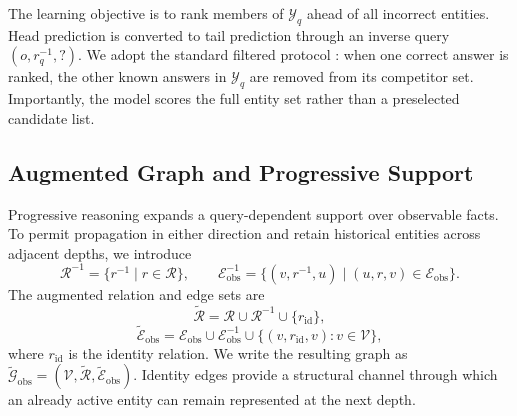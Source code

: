 \documentclass[a4paper,fleqn]{cas-sc}
\begin{document}
The learning objective is to rank members of $\mathcal{Y}_{q}$ ahead of all
incorrect entities. Head prediction is converted to tail prediction through an
inverse query $(o,r_q^{-1},?)$. We adopt the standard filtered protocol
\citep{bordes2013transe}: when one correct answer is ranked, the other known
answers in $\mathcal{Y}_{q}$ are removed from its competitor set. Importantly,
the model scores the full entity set rather than a preselected candidate list.

\subsection{Augmented Graph and Progressive Support}
\label{subsec:augmented_graph}

Progressive reasoning expands a query-dependent support over observable facts.
To permit propagation in either direction and retain historical entities across
adjacent depths, we introduce
\begin{equation}
\mathcal{R}^{-1}=\{r^{-1}\mid r\in\mathcal{R}\},
\qquad
\mathcal{E}_{\mathrm{obs}}^{-1}
=
\{(v,r^{-1},u)\mid(u,r,v)\in\mathcal{E}_{\mathrm{obs}}\}.
\end{equation}
The augmented relation and edge sets are
\begin{equation}
\widetilde{\mathcal{R}}
=
\mathcal{R}\cup\mathcal{R}^{-1}\cup\{r_{\mathrm{id}}\},
\end{equation}
\begin{equation}
\widetilde{\mathcal{E}}_{\mathrm{obs}}
=
\mathcal{E}_{\mathrm{obs}}\cup\mathcal{E}_{\mathrm{obs}}^{-1}
\cup\{(v,r_{\mathrm{id}},v):v\in\mathcal{V}\},
\end{equation}
where $r_{\mathrm{id}}$ is the identity relation. We write the resulting graph
as
$\widetilde{\mathcal{G}}_{\mathrm{obs}}
=(\mathcal{V},\widetilde{\mathcal{R}},
\widetilde{\mathcal{E}}_{\mathrm{obs}})$. Identity edges provide a structural
channel through which an already active entity can remain represented at the
next depth.
\end{document}
